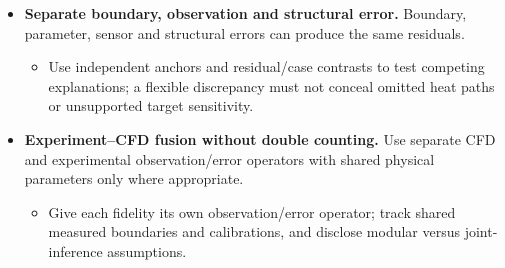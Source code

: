\begin{itemize}[leftmargin=*]
\item {}\textbf{Separate boundary, observation and structural error.} Boundary, parameter, sensor and structural errors can produce the same residuals.\cite{oliver2014unobserved}
\begin{itemize}
\item Use independent anchors and residual/\allowbreak{}case contrasts to test competing explanations; a flexible discrepancy must not conceal omitted heat paths or unsupported target sensitivity.
\end{itemize}
\item {}\textbf{Experiment--CFD fusion without double counting.} Use separate CFD and experimental observation/\allowbreak{}error operators with shared physical parameters only where appropriate.\cite{oliver2014unobserved}
\begin{itemize}
\item Give each fidelity its own observation/\allowbreak{}error operator; track shared measured boundaries and calibrations, and disclose modular versus joint-inference assumptions.
\end{itemize}
\end{itemize}

